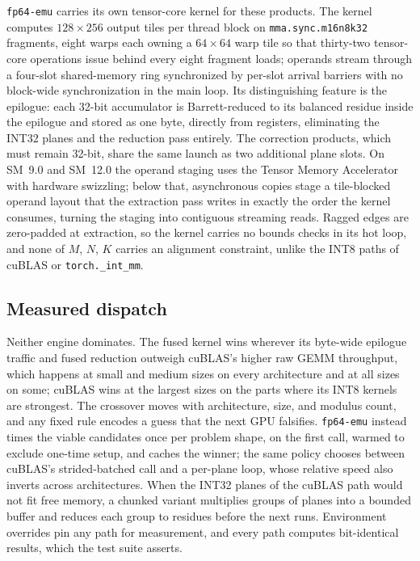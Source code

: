 \documentclass[11pt]{amsart}
\theoremstyle{plain}
\theoremstyle{definition}
\newcommand{\code}[1]{\texttt{#1}}
\newcommand{\fpemu}{\code{fp64-emu}}
\begin{document}
\fpemu{} carries its own tensor-core kernel for these products. The kernel
computes $128 \times 256$ output tiles per thread block on
\code{mma.sync.m16n8k32} fragments, eight warps each owning a
$64 \times 64$ warp tile so that thirty-two tensor-core operations issue
behind every eight fragment loads; operands stream through a four-slot
shared-memory ring synchronized by per-slot arrival barriers with no
block-wide synchronization in the main loop. Its distinguishing feature is
the epilogue: each 32-bit accumulator is Barrett-reduced to its balanced
residue inside the epilogue and stored as one byte, directly from
registers, eliminating the INT32 planes and the reduction pass entirely.
The correction products, which must remain 32-bit, share the same launch
as two additional plane slots. On SM~9.0 and SM~12.0 the operand staging
uses the Tensor Memory Accelerator with hardware swizzling; below that,
asynchronous copies stage a tile-blocked operand layout that the
extraction pass writes in exactly the order the kernel consumes, turning
the staging into contiguous streaming reads. Ragged edges are zero-padded
at extraction, so the kernel carries no bounds checks in its hot loop, and
none of $M$, $N$, $K$ carries an alignment constraint, unlike the
INT8 paths of cuBLAS or \code{torch.\_int\_mm}.

\subsection{Measured dispatch}

Neither engine dominates. The fused kernel wins wherever its byte-wide
epilogue traffic and fused reduction outweigh cuBLAS's higher raw GEMM
throughput, which happens at small and medium sizes on every architecture
and at all sizes on some; cuBLAS wins at the largest sizes on the parts
where its INT8 kernels are strongest. The crossover moves with
architecture, size, and modulus count, and any fixed rule encodes a guess
that the next GPU falsifies. \fpemu{} instead times the viable candidates
once per problem shape, on the first call, warmed to exclude one-time
setup, and caches the winner; the same policy chooses between cuBLAS's
strided-batched call and a per-plane loop, whose relative speed also
inverts across architectures. When the INT32 planes of the cuBLAS path
would not fit free memory, a chunked variant multiplies groups of planes
into a bounded buffer and reduces each group to residues before the next
runs. Environment overrides pin any path for measurement, and every path
computes bit-identical results, which the test suite asserts.
\end{document}
